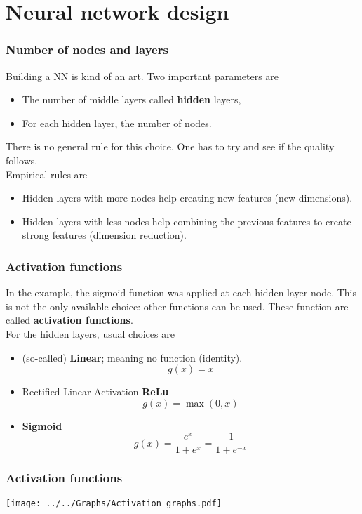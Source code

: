 \section{Neural network design}
\begin{frame}
\frametitle{Number of nodes and layers}
Building a NN is kind of an art. Two important parameters are
\begin{itemize}
\item The number of middle layers called {\bf hidden} layers,
\item For each hidden layer, the number of nodes.
\end{itemize}
There is no general rule for this choice. One has to try and see if the quality follows.\\
\vspace{0.3cm} 
Empirical rules are
\begin{itemize}
\item Hidden layers with more nodes help creating new features (new dimensions).
\item Hidden layers with less nodes help combining the previous features to create strong features (dimension reduction).
\end{itemize}
\end{frame}
\begin{frame}
\frametitle{Activation functions}
In the example, the sigmoid function was applied at each hidden layer node. This is not the only available choice: other functions can be used. These function are called {\bf activation functions}.\\
\vspace{0.3cm}
For the hidden layers, usual choices are
\begin{itemize}
\item (so-called) {\bf Linear}; meaning no function (identity).
$$
g(x) = x
$$
\item Rectified Linear Activation {\bf ReLu}
$$
g(x) = \max(0,x)
$$
\item {\bf Sigmoid}
$$
g(x) = \frac{e^x}{1+e^x} = \frac{1}{1+e^{-x}}
$$
\end{itemize}
\end{frame}
\begin{frame}
\frametitle{Activation functions}
\begin{center}
\texttt{[image: ../../Graphs/Activation\_graphs.pdf]}
\end{center}
\end{frame}
